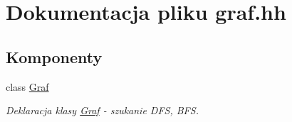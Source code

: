 \hypertarget{graf_8hh}{\section{\-Dokumentacja pliku graf.\-hh}
\label{graf_8hh}
}
\subsection*{\-Komponenty}
\begin{DoxyCompactItemize}
\item 
class \hyperlink{class_graf}{\-Graf}
\begin{DoxyCompactList}\small\item\em \-Deklaracja klasy \hyperlink{class_graf}{\-Graf} -\/ szukanie \-D\-F\-S, \-B\-F\-S. \end{DoxyCompactList}\end{DoxyCompactItemize}

